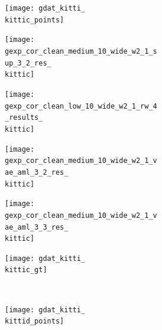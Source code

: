 \begin{figure}[t]
{\begin{subfigure}[t]{0.5\textwidth}
\begin{subfigure}[t]{0.15\textwidth}
			\vspace{0px}\centering
			\texttt{[image: gdat\_kitti\_\\kittic\_points]}
		\end{subfigure}
		\begin{subfigure}[t]{0.15\textwidth}
			\vspace{0px}\centering
			\texttt{[image: gexp\_cor\_clean\_medium\_10\_wide\_w2\_1\_sup\_3\_2\_res\_\\kittic]}
		\end{subfigure}
		\begin{subfigure}[t]{0.15\textwidth}
			\vspace{0px}\centering
			\texttt{[image: gexp\_cor\_clean\_low\_10\_wide\_w2\_1\_rw\_4\_results\_\\kittic]}
		\end{subfigure}
		\begin{subfigure}[t]{0.15\textwidth}
			\vspace{0px}\centering
			\texttt{[image: gexp\_cor\_clean\_medium\_10\_wide\_w2\_1\_vae\_aml\_3\_2\_res\_\\kittic]}
		\end{subfigure}
		\begin{subfigure}[t]{0.15\textwidth}
			\vspace{0px}\centering
			\texttt{[image: gexp\_cor\_clean\_medium\_10\_wide\_w2\_1\_vae\_aml\_3\_3\_res\_\\kittic]}
		\end{subfigure}
		\begin{subfigure}[t]{0.15\textwidth}
			\vspace{0px}\centering
			\texttt{[image: gdat\_kitti\_\\kittic\_gt]}
		\end{subfigure}
		\\[-4px]
		\begin{subfigure}[t]{0.15\textwidth}
			\vspace{0px}\centering
			\texttt{[image: gdat\_kitti\_\\kittid\_points]}
		\end{subfigure}
		\begin{subfigure}[t]{0.15\textwidth}

\end{subfigure}
\end{subfigure}}
\end{figure}
